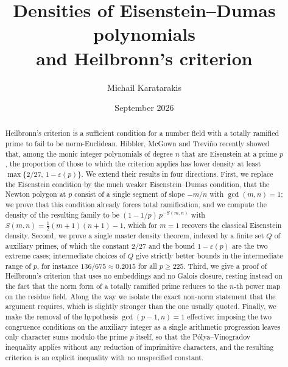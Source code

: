 \documentclass[11pt,reqno]{amsart}
\theoremstyle{plain}
\theoremstyle{definition}
\theoremstyle{remark}
\begin{document}
\title[Densities of Eisenstein--Dumas polynomials and Heilbronn's criterion]
  {Densities of Eisenstein--Dumas polynomials \\ and Heilbronn's criterion}

\author{Michail Karatarakis}

\date{September 2026}

\begin{abstract}
Heilbronn's criterion is a sufficient condition for a number field with a totally ramified
prime to fail to be norm-Euclidean. Hibbler, McGown and Trevi\~no recently showed that, among
the monic integer polynomials of degree $n$ that are Eisenstein at a prime $p$, the proportion
of those to which the criterion applies has lower density at least $\max\{2/27,\,1-\varepsilon(p)\}$.
We extend their results in four directions. First, we replace the Eisenstein condition by the
much weaker Eisenstein--Dumas condition, that the Newton polygon at $p$ consist of a single
segment of slope $-m/n$ with $\gcd(m,n)=1$; we prove that this condition already forces total
ramification, and we compute the density of the resulting family to be
$(1-1/p)\,p^{-S(m,n)}$ with $S(m,n)=\tfrac12(m+1)(n+1)-1$, which for $m=1$ recovers the classical
Eisenstein density. Second, we prove a single master density theorem, indexed by a finite set $Q$
of auxiliary primes, of which the constant $2/27$ and the bound $1-\varepsilon(p)$ are the two
extreme cases; intermediate choices of $Q$ give strictly better bounds in the intermediate range
of $p$, for instance $136/675 \approx 0.2015$ for all $p \ge 225$. Third, we give a proof of
Heilbronn's criterion that uses no embeddings and no Galois closure, resting instead on the fact
that the norm form of a totally ramified prime reduces to the $n$-th power map on the residue
field. Along the way we isolate the exact non-norm statement that the argument requires, which is
slightly stronger than the one usually quoted. Finally, we make the removal of the hypothesis
$\gcd(p-1,n)=1$ effective: imposing the two congruence conditions on the auxiliary integer as a
single arithmetic progression leaves only character sums modulo the prime $p$ itself, so that the
Pólya--Vinogradov inequality applies without any reduction of imprimitive characters, and the
resulting criterion is an explicit inequality with no unspecified constant.
\end{abstract}

\maketitle
\end{document}
